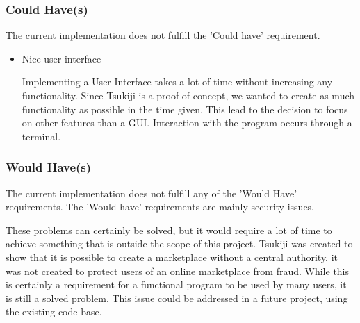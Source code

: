 \subsubsection{Could Have(s)}
The current implementation does not fulfill the 'Could have' requirement.

\begin{itemize}
\item Nice user interface

Implementing a User Interface takes a lot of time without increasing any functionality.
Since Tsukiji is a proof of concept, we wanted to create as much functionality as possible in the time given.
This lead to the decision to focus on other features than a GUI.
Interaction with the program occurs through a terminal.
\end{itemize}

\subsubsection{Would Have(s)}
The current implementation does not fulfill any of the 'Would Have' requirements.
The 'Would have'-requirements are mainly security issues.

These problems can certainly be solved, but it would require a lot of time to achieve something that is outside the scope of this project.
Tsukiji was created to show that it is possible to create a marketplace without a central authority, it was not created to protect users of an online marketplace from fraud.
While this is certainly a requirement for a functional program to be used by many users, it is still a solved problem.
This issue could be addressed in a future project, using the existing code-base.

